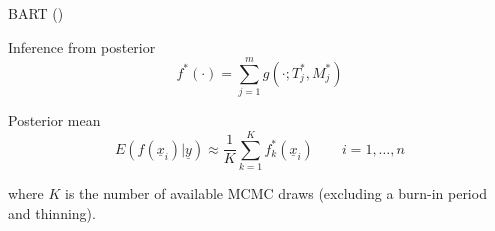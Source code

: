 \documentclass[10pt]{beamer}
\begin{document}

\begin{frame}{BART (\cite{Chipman_2010})}
    \begin{block}{Inference from posterior}
        \begin{equation}
            f^*(\cdot) = \sum_{j=1}^mg(\cdot;T^*_j,M^*_j)
        \end{equation}
    \end{block}
    \begin{block}{Posterior mean}
        \begin{equation}
            E(f(\underline{x}_i)|\underline{y}) \approx \frac{1}{K}\sum_{k=1}^Kf^*_k(\underline{x}_i)  \qquad i = 1, \dots, n
        \end{equation}
    \end{block}
    where $K$ is the number of available MCMC draws (excluding a burn-in period and thinning).
\end{frame}
\end{document}
